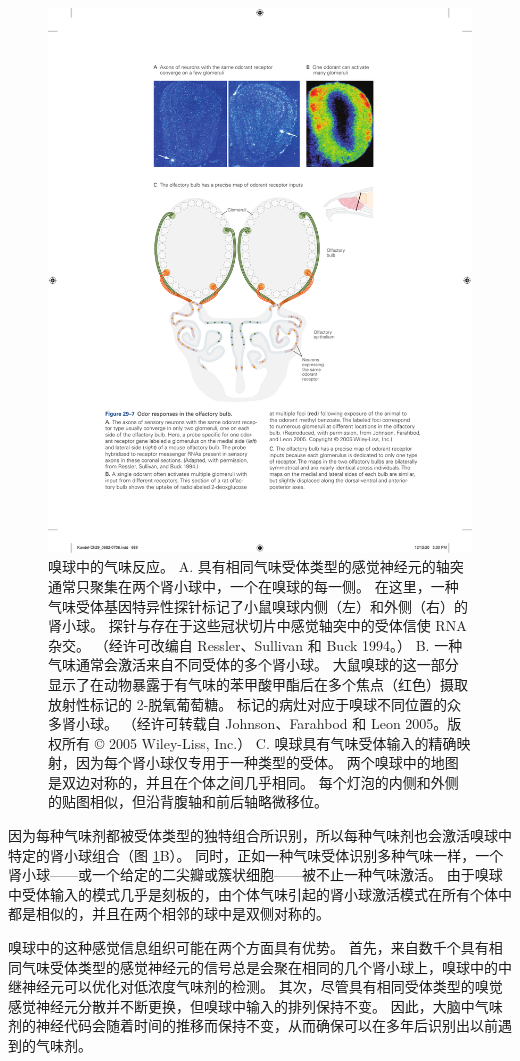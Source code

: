 \begin{figure}[htbp]
	\centering
	\includegraphics[width=0.7\linewidth]{chap29/fig_29_7}
	\caption{嗅球中的气味反应。 A. 具有相同气味受体类型的感觉神经元的轴突通常只聚集在两个肾小球中，一个在嗅球的每一侧。 在这里，一种气味受体基因特异性探针标记了小鼠嗅球内侧（左）和外侧（右）的肾小球。 探针与存在于这些冠状切片中感觉轴突中的受体信使 RNA 杂交。 （经许可改编自 Ressler、Sullivan 和 Buck 1994。） B. 一种气味通常会激活来自不同受体的多个肾小球。 大鼠嗅球的这一部分显示了在动物暴露于有气味的苯甲酸甲酯后在多个焦点（红色）摄取放射性标记的 2-脱氧葡萄糖。 标记的病灶对应于嗅球不同位置的众多肾小球。 （经许可转载自 Johnson、Farahbod 和 Leon 2005。版权所有 © 2005 Wiley-Liss, Inc.） C. 嗅球具有气味受体输入的精确映射，因为每个肾小球仅专用于一种类型的受体。 两个嗅球中的地图是双边对称的，并且在个体之间几乎相同。 每个灯泡的内侧和外侧的贴图相似，但沿背腹轴和前后轴略微移位。}
	\label{fig:29_7}
\end{figure}


因为每种气味剂都被受体类型的独特组合所识别，所以每种气味剂也会激活嗅球中特定的肾小球组合（图 \ref{fig:29_7}B）。 
同时，正如一种气味受体识别多种气味一样，一个肾小球——或一个给定的二尖瓣或簇状细胞——被不止一种气味激活。 由于嗅球中受体输入的模式几乎是刻板的，由个体气味引起的肾小球激活模式在所有个体中都是相似的，并且在两个相邻的球中是双侧对称的。

嗅球中的这种感觉信息组织可能在两个方面具有优势。 首先，来自数千个具有相同气味受体类型的感觉神经元的信号总是会聚在相同的几个肾小球上，嗅球中的中继神经元可以优化对低浓度气味剂的检测。 其次，尽管具有相同受体类型的嗅觉感觉神经元分散并不断更换，但嗅球中输入的排列保持不变。 因此，大脑中气味剂的神经代码会随着时间的推移而保持不变，从而确保可以在多年后识别出以前遇到的气味剂。

